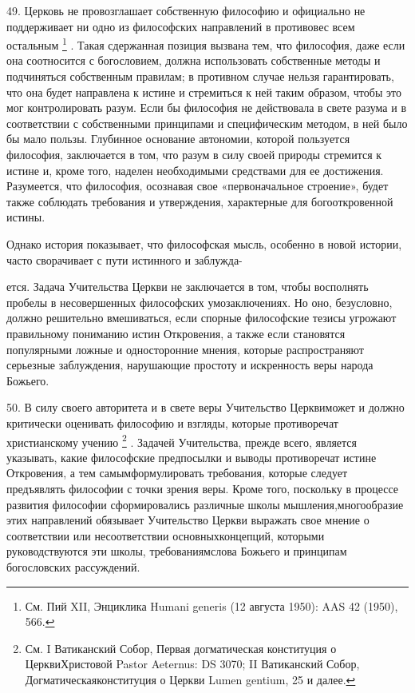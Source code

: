 \documentclass[a5paper,10pt]{article}
\begin{document}
49. Церковь не провозглашает собственную философию и официально не поддерживает
ни одно из философских направлений в противовес всем остальным \footnote{См.
Пий XII, Энциклика Humani generis (12 августа 1950): AAS 42 (1950), 566.}  .
Такая сдержанная позиция вызвана тем, что философия, даже если она соотносится
с богословием, должна использовать собственные методы и подчиняться собственным
правилам; в противном случае нельзя гарантировать, что она будет направлена к
истине и стремиться к ней таким образом, чтобы это мог контролировать разум.
Если бы философия не действовала в свете разума и в соответствии с собственными
принципами и специфическим методом, в ней было бы мало пользы. Глубинное
основание автономии, которой пользуется философия, заключается в том, что разум
в силу своей природы стремится к истине и, кроме того, наделен необходимыми
средствами для ее достижения. Разумеется, что философия, осознавая свое
«первоначальное строение», будет также соблюдать требования и утверждения,
характерные для богооткровенной истины.

Однако история показывает, что философская мысль, особенно в новой истории,
часто сворачивает с пути истинного и заблужда-

ется. Задача Учительства Церкви не заключается в том, чтобы восполнять пробелы
в несовершенных философских умозаключениях. Но оно, безусловно, должно
решительно вмешиваться, если спорные философские тезисы угрожают правильному
пониманию истин Откровения, а также если становятся популярными ложные и
односторонние мнения, которые распространяют серьезные заблуждения, нарушающие
простоту и искренность веры народа Божьего.

50. В силу своего авторитета и в свете веры Учительство Церквиможет и должно
критически оценивать философию и взгляды, которые противоречат христианскому
учению \footnote{См. I Ватиканский Собор, Первая догматическая конституция о
ЦерквиХристовой Pastor Aeternus: DS 3070; II Ватиканский Собор,
Догматическаяконституция о Церкви Lumen gentium, 25 и далее.}  . Задачей
Учительства, прежде всего, является указывать, какие философские предпосылки и
выводы противоречат истине Откровения, а тем самымформулировать требования,
которые следует предъявлять философии с точки зрения веры. Кроме того,
поскольку в процессе развития философии сформировались различные школы
мышления,многообразие этих направлений обязывает Учительство Церкви выражать
свое мнение о соответствии или несоответствии основныхконцепций, которыми
руководствуются эти школы, требованиямслова Божьего и принципам богословских
рассуждений.
\end{document}
